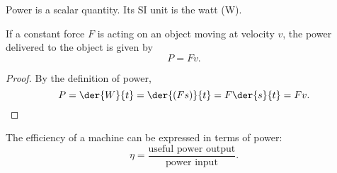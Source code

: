 Power is a scalar quantity. Its SI unit is the watt (W).

\begin{proposition}
   If a constant force $F$ is acting on an object moving at velocity $v$, the power delivered to the object is given by \[P = Fv.\]
\end{proposition}
\begin{proof}
    By the definition of power, \[P = \der{W}{t} = \der{(Fs)}{t} = F \der{s}{t} = F v.\]
\end{proof}

The efficiency of a machine can be expressed in terms of power: \[\eta = \frac{\text{useful power output}}{\text{power input}}.\]